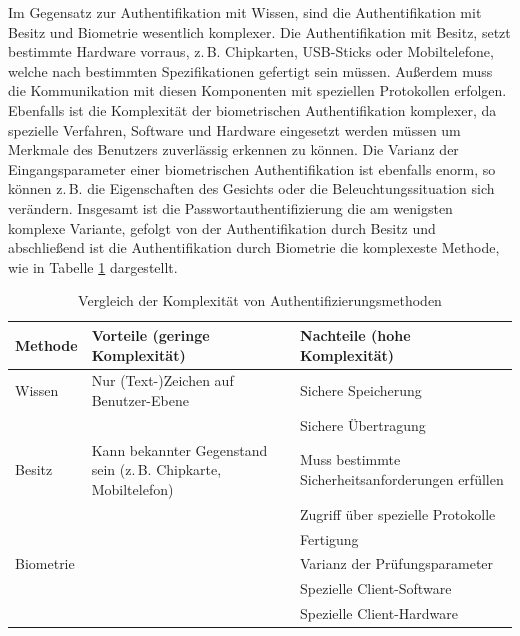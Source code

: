 \documentclass[11pt,a4paper,ngerman]{scrreprt}
\begin{document}
Im Gegensatz zur Authentifikation mit Wissen, sind die Authentifikation mit Besitz und Biometrie wesentlich komplexer. Die Authentifikation mit Besitz, setzt bestimmte Hardware vorraus, z.\,B. Chipkarten, USB-Sticks oder Mobiltelefone, welche nach bestimmten Spezifikationen gefertigt sein müssen. Außerdem muss die Kommunikation mit diesen Komponenten mit speziellen Protokollen erfolgen. Ebenfalls ist die Komplexität der biometrischen Authentifikation komplexer, da spezielle Verfahren, Software und Hardware eingesetzt werden müssen um Merkmale des Benutzers zuverlässig erkennen zu können. Die Varianz der Eingangsparameter einer biometrischen Authentifikation ist ebenfalls enorm, so können z.\,B. die Eigenschaften des Gesichts oder die Beleuchtungssituation sich verändern. Insgesamt ist die Passwortauthentifizierung die am wenigsten komplexe Variante, gefolgt von der Authentifikation durch Besitz und abschließend ist die Authentifikation durch Biometrie die komplexeste Methode, wie in Tabelle \ref{table:Komplexität} dargestellt.
\begin{table}[htbp]
    \begin{tabularx}{\textwidth}{ lXX }
        \toprule
        Methode & Vorteile (geringe Komplexität) & Nachteile (hohe Komplexität) \\ 
        \midrule
        Wissen & Nur (Text-)Zeichen auf Benutzer-Ebene & Sichere Speicherung \\
         & & Sichere Übertragung \\
        \midrule
        Besitz & Kann bekannter Gegenstand sein (z.\,B. Chipkarte, Mobiltelefon) & Muss bestimmte Sicherheitsanforderungen erfüllen \\
         & & Zugriff über spezielle Protokolle \\
         & & Fertigung \\
        \midrule
        Biometrie & & Varianz der Prüfungsparameter \\
         & & Spezielle Client-Software \\
         & & Spezielle Client-Hardware \\
        \bottomrule
    \end{tabularx}
    \caption{Vergleich der Komplexität von Authentifizierungsmethoden}
    \label{table:Komplexität}
\end{table}
\end{document}
